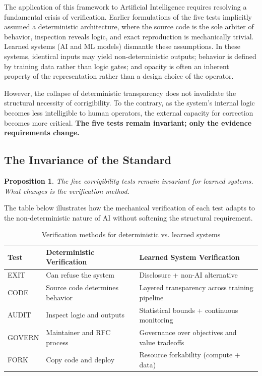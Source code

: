 \documentclass{article}
\newtheorem{proposition}{Proposition}
\begin{document}
The application of this framework to Artificial Intelligence requires resolving a fundamental crisis of verification. Earlier formulations of the five tests implicitly assumed a deterministic architecture, where the source code is the sole arbiter of behavior, inspection reveals logic, and exact reproduction is mechanically trivial. Learned systems (AI and ML models) dismantle these assumptions. In these systems, identical inputs may yield non-deterministic outputs; behavior is defined by training data rather than logic gates; and opacity is often an inherent property of the representation rather than a design choice of the operator.

However, the collapse of deterministic transparency does not invalidate the structural necessity of corrigibility. To the contrary, as the system's internal logic becomes less intelligible to human operators, the external capacity for correction becomes more critical. \textbf{The five tests remain invariant; only the evidence requirements change.}

\subsection{The Invariance of the Standard}

\begin{proposition}
The five corrigibility tests remain invariant for learned systems. What changes is the verification method.
\end{proposition}

The table below illustrates how the mechanical verification of each test adapts to the non-deterministic nature of AI without softening the structural requirement.

\begin{table}[htbp]
\centering
\begin{tabular}{@{}lll@{}}
\toprule
\textbf{Test} & \textbf{Deterministic Verification} & \textbf{Learned System Verification} \\
\midrule
EXIT & Can refuse the system & Disclosure + non-AI alternative \\
CODE & Source code determines behavior & Layered transparency across training pipeline \\
AUDIT & Inspect logic and outputs & Statistical bounds + continuous monitoring \\
GOVERN & Maintainer and RFC process & Governance over objectives and value tradeoffs \\
FORK & Copy code and deploy & Resource forkability (compute + data) \\
\bottomrule
\end{tabular}
\caption{Verification methods for deterministic vs. learned systems}
\end{table}
\end{document}
